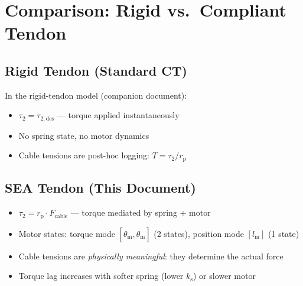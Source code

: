 \documentclass[11pt,a4paper]{article}
\newcommand{\rp}{r_{\mathrm{p}}}
\newcommand{\lm}{l_{\mathrm{m}}}
\newcommand{\ks}{k_{\mathrm{s}}}
\newcommand{\thetam}{\theta_{\mathrm{m}}}
\begin{document}
\section{Comparison: Rigid vs.\ Compliant Tendon}
\label{sec:comparison}

\subsection{Rigid Tendon (Standard CT)}

In the rigid-tendon model (companion document):
\begin{itemize}[leftmargin=2em]
    \item $\tau_2 = \tau_{2,\mathrm{des}}$ --- torque applied instantaneously
    \item No spring state, no motor dynamics
    \item Cable tensions are post-hoc logging: $T = \tau_2 / \rp$
\end{itemize}

\subsection{SEA Tendon (This Document)}

\begin{itemize}[leftmargin=2em]
    \item $\tau_2 = \rp \cdot F_{\mathrm{cable}}$ --- torque mediated by spring + motor
    \item Motor states: torque mode $[\thetam, \dot{\thetam}]$ (2 states), position mode $[\lm]$ (1 state)
    \item Cable tensions are \emph{physically meaningful}: they determine the actual force
    \item Torque lag increases with softer spring (lower $\ks$) or slower motor
\end{itemize}
\end{document}
